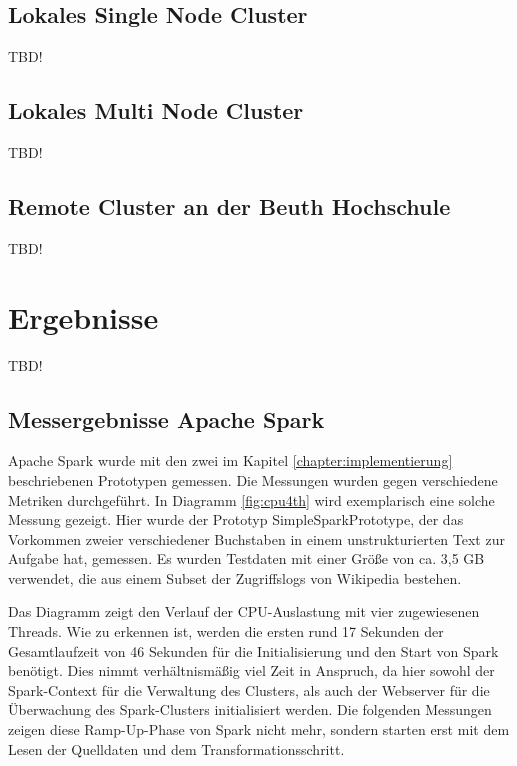 \newpage

\subsection{Lokales Single Node Cluster  }
\label{section:lokales single node}

TBD!

\subsection{Lokales Multi Node Cluster}
\label{section:tachyon}

TBD!

\subsection{Remote Cluster an der Beuth Hochschule}
\label{section:remote}

TBD!

\section{Ergebnisse}
\label{section:ergebnisse}

TBD!

\subsection{Messergebnisse Apache Spark}
\label{section:spark eval}

Apache Spark wurde mit den zwei im Kapitel \ref{chapter:implementierung} beschriebenen Prototypen gemessen. Die Messungen wurden gegen verschiedene Metriken durchgeführt. In Diagramm \ref{fig:cpu4th} wird exemplarisch eine solche Messung gezeigt. Hier wurde der Prototyp SimpleSparkPrototype, der das Vorkommen zweier verschiedener Buchstaben in einem unstrukturierten Text zur Aufgabe hat, gemessen. Es wurden Testdaten mit einer Größe von ca. 3,5 GB verwendet, die aus einem Subset der Zugriffslogs von Wikipedia bestehen. 

Das Diagramm zeigt den Verlauf der CPU-Auslastung mit vier zugewiesenen Threads. Wie zu erkennen ist, werden die ersten rund 17 Sekunden der Gesamtlaufzeit von 46 Sekunden für die Initialisierung und den Start von Spark benötigt. Dies nimmt verhältnismäßig viel Zeit in Anspruch, da hier sowohl der Spark-Context für die Verwaltung des Clusters, als auch der Webserver für die Überwachung des Spark-Clusters initialisiert werden. Die folgenden Messungen zeigen diese Ramp-Up-Phase von Spark nicht mehr, sondern starten erst mit dem Lesen der Quelldaten und dem Transformationsschritt.  

